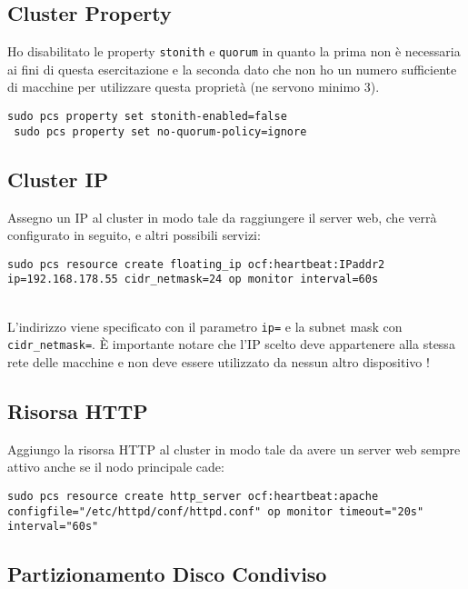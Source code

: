 \subsection{Cluster Property}

Ho disabilitato le property \lstinline[style=cmd]|stonith| e \lstinline[style=cmd]|quorum| in quanto la prima non \`{e} necessaria ai fini di questa esercitazione e la seconda dato che non ho un numero sufficiente di macchine per utilizzare questa propriet\`{a} (ne servono minimo 3).

\begin{lstlisting}[style=cmd]
 sudo pcs property set stonith-enabled=false
 sudo pcs property set no-quorum-policy=ignore
\end{lstlisting}

\subsection{Cluster IP}

Assegno un IP al cluster in modo tale da raggiungere il server web, che verr\`{a} configurato in seguito, e altri possibili servizi:

\begin{lstlisting}[style=cmd]
 sudo pcs resource create floating_ip ocf:heartbeat:IPaddr2 ip=192.168.178.55 cidr_netmask=24 op monitor interval=60s
\end{lstlisting}
\ \\
L'indirizzo viene specificato con il parametro \lstinline[style=cmd]|ip=| e la subnet mask con \lstinline[style=cmd]|cidr_netmask=|. \`{E} importante notare che l'IP scelto deve appartenere alla stessa rete delle macchine e non deve essere utilizzato da nessun altro dispositivo !

\subsection{Risorsa HTTP}

Aggiungo la risorsa HTTP al cluster in modo tale da avere un server web sempre attivo anche se il nodo principale cade:

\begin{lstlisting}[style=cmd]
 sudo pcs resource create http_server ocf:heartbeat:apache configfile="/etc/httpd/conf/httpd.conf" op monitor timeout="20s" interval="60s"
\end{lstlisting}

\subsection{Partizionamento Disco Condiviso}
\label{sec:partizione}

